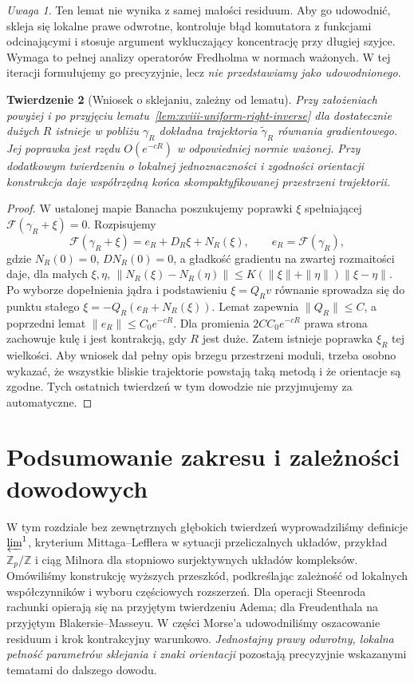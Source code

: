 \documentclass[11pt,a4paper,oneside]{report}
\newcommand{\Z}{\mathbb{Z}}
\theoremstyle{plain}
\newtheorem{twierdzenie}{Twierdzenie}[section]
\theoremstyle{definition}
\theoremstyle{remark}
\newtheorem{uwaga}[twierdzenie]{Uwaga}
\begin{document}
\begin{uwaga}
Ten lemat nie wynika z samej małości residuum.
Aby go udowodnić, skleja się lokalne prawe odwrotne,
kontroluje błąd komutatora z funkcjami odcinającymi i
stosuje argument wykluczający koncentrację przy długiej szyjce.
Wymaga to pełnej analizy operatorów Fredholma w normach
ważonych. W tej iteracji formułujemy go precyzyjnie,
lecz \emph{nie przedstawiamy jako udowodnionego}.
\end{uwaga}
\begin{twierdzenie}[Wniosek o sklejaniu, zależny od lematu]
\label{thm:xviii-gluing-conditional}
Przy założeniach powyżej i po przyjęciu
lematu~\ref{lem:xviii-uniform-right-inverse} dla dostatecznie
dużych $R$ istnieje w pobliżu $\gamma_R$ dokładna
trajektoria $\widetilde\gamma_R$ równania gradientowego.
Jej poprawka jest rzędu $O(e^{-cR})$ w odpowiedniej normie
ważonej. Przy dodatkowym twierdzeniu o lokalnej jednoznaczności
i zgodności orientacji konstrukcja daje współrzędną końca
skompaktyfikowanej przestrzeni trajektorii.
\end{twierdzenie}
\begin{proof}
W ustalonej mapie Banacha poszukujemy poprawki $\xi$
spełniającej $\mathcal F(\gamma_R+\xi)=0$. Rozpisujemy
\[
\mathcal F(\gamma_R+\xi)=e_R+D_R\xi+N_R(\xi),
\qquad e_R=\mathcal F(\gamma_R),
\]
gdzie $N_R(0)=0$, $DN_R(0)=0$, a gładkość gradientu
na zwartej rozmaitości daje, dla małych $\xi,\eta$,
$\|N_R(\xi)-N_R(\eta)\|
\le K(\|\xi\|+\|\eta\|)\|\xi-\eta\|$.
Po wyborze dopełnienia jądra i podstawieniu
$\xi=Q_Rv$ równanie sprowadza się do punktu stałego
$\xi=-Q_R(e_R+N_R(\xi))$.
Lemat zapewnia $\|Q_R\|\le C$, a poprzedni lemat
$\|e_R\|\le C_0e^{-cR}$. Dla promienia
$2CC_0e^{-cR}$ prawa strona zachowuje kulę i jest
kontrakcją, gdy $R$ jest duże. Zatem istnieje poprawka
$\xi_R$ tej wielkości. Aby wniosek dał pełny opis
brzegu przestrzeni moduli, trzeba osobno wykazać, że
wszystkie bliskie trajektorie powstają taką metodą i że
orientacje są zgodne. Tych ostatnich twierdzeń w tym
dowodzie nie przyjmujemy za automatyczne.
\end{proof}

\section{Podsumowanie zakresu i zależności dowodowych}
W tym rozdziale bez zewnętrznych głębokich twierdzeń
wyprowadziliśmy definicje $\varprojlim^1$, kryterium
Mittaga--Lefflera w sytuacji przeliczalnych układów,
przykład $\Z_p/\Z$ i ciąg Milnora dla stopniowo surjektywnych
układów kompleksów. Omówiliśmy konstrukcję
wyższych przeszkód, podkreślając zależność od lokalnych
współczynników i wyboru częściowych rozszerzeń.
Dla operacji Steenroda rachunki opierają się na
przyjętym twierdzeniu Adema; dla Freudenthala na
przyjętym Blakersie--Masseyu.
W części Morse'a udowodniliśmy oszacowanie residuum i
krok kontrakcyjny warunkowo. \emph{Jednostajny prawy odwrotny,
lokalna pełność parametrów sklejania i znaki orientacji}
pozostają precyzyjnie wskazanymi tematami do dalszego dowodu.
\end{document}
